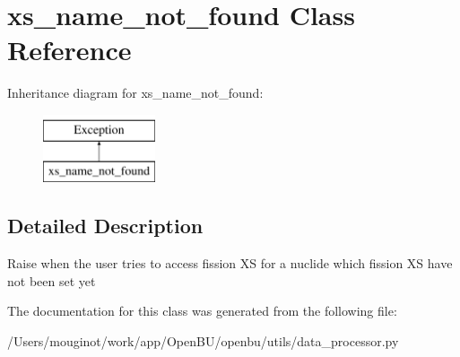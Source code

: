 \hypertarget{classopenbu_1_1utils_1_1data__processor_1_1xs__name__not__found}{}\section{xs\+\_\+name\+\_\+not\+\_\+found Class Reference}
\label{classopenbu_1_1utils_1_1data__processor_1_1xs__name__not__found}
Inheritance diagram for xs\+\_\+name\+\_\+not\+\_\+found\+:\begin{figure}[H]
\begin{center}
\leavevmode
\includegraphics[height=2.000000cm]{classopenbu_1_1utils_1_1data__processor_1_1xs__name__not__found}
\end{center}
\end{figure}


\subsection{Detailed Description}
\begin{DoxyVerb}Raise when the user tries to access fission XS for a nuclide which fission XS have not been set yet \end{DoxyVerb}
 

The documentation for this class was generated from the following file\+:\begin{DoxyCompactItemize}
\item 
/\+Users/mouginot/work/app/\+Open\+B\+U/openbu/utils/data\+\_\+processor.\+py\end{DoxyCompactItemize}
